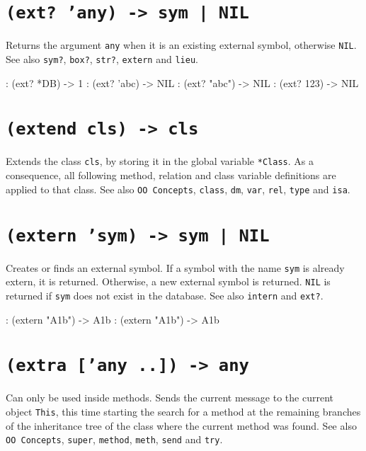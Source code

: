  
\section*{\texttt{(ext? 'any) -> sym | NIL}}
\label{sec:func-ref-E-(ext? 'any) -> sym | NIL}


Returns the argument \texttt{any} when it is an existing external symbol,
otherwise \texttt{NIL}. See also \texttt{sym?}, \texttt{box?}, \texttt{str?}, \texttt{extern} and \texttt{lieu}.


\begin{wideverbatim}
: (ext? *DB)
-> {1}
: (ext? 'abc)
-> NIL
: (ext? "abc")
-> NIL
: (ext? 123)
-> NIL
\end{wideverbatim}

 
\section*{\texttt{(extend cls) -> cls}}
\label{sec:func-ref-E-(extend cls) -> cls}


Extends the class \texttt{cls}, by storing it in the global variable \texttt{*Class}.
As a consequence, all following method, relation and class variable
definitions are applied to that class. See also \texttt{OO Concepts}, \texttt{class},
\texttt{dm}, \texttt{var}, \texttt{rel}, \texttt{type} and \texttt{isa}.

 
\section*{\texttt{(extern 'sym) -> sym | NIL}}
\label{sec:func-ref-E-(extern 'sym) -> sym | NIL}

Creates or finds an external symbol. If a symbol with the name \texttt{sym} is
already extern, it is returned. Otherwise, a new external symbol is
returned. \texttt{NIL} is returned if \texttt{sym} does not exist in the database. See
also \texttt{intern} and \texttt{ext?}.

\begin{wideverbatim}
    : (extern "A1b")
    -> {A1b}
    : (extern "{A1b}")
    -> {A1b}
\end{wideverbatim}

 
\section*{\texttt{(extra ['any ..]) -> any}}
\label{sec:func-ref-E-(extra ['any ..]) -> any}


Can only be used inside methods. Sends the current message to the
current object \texttt{This}, this time starting the search for a method at the
remaining branches of the inheritance tree of the class where the
current method was found. See also \texttt{OO Concepts}, \texttt{super}, \texttt{method},
\texttt{meth}, \texttt{send} and \texttt{try}.


